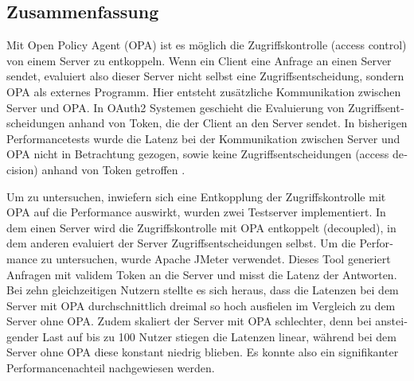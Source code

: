\begin{otherlanguage}{ngerman}
	\chapter*{Zusammenfassung}
	Mit Open Policy Agent (OPA) ist es möglich die Zugriffskontrolle (access control) von einem Server zu entkoppeln. Wenn ein Client eine Anfrage an einen Server sendet, evaluiert also dieser Server nicht selbst eine Zugriffsentscheidung, sondern OPA als externes Programm. Hier entsteht zusätzliche Kommunikation zwischen Server und OPA. In OAuth2 Systemen geschieht die Evaluierung von Zugriffsentscheidungen anhand von Token, die der Client an den Server sendet. In bisherigen Performancetests wurde die Latenz bei der Kommunikation zwischen Server und OPA nicht in Betrachtung gezogen, sowie keine Zugriffsentscheidungen (access decision) anhand von Token getroffen \citep{opaperformance:2021:07}.\smallskip

	Um zu untersuchen, inwiefern sich eine Entkopplung der Zugriffskontrolle mit OPA auf die Performance auswirkt, wurden zwei Testserver implementiert. In dem einen Server wird die Zugriffskontrolle mit OPA entkoppelt (decoupled), in dem anderen evaluiert der Server Zugriffsentscheidungen selbst. Um die Performance zu untersuchen, wurde Apache JMeter verwendet. Dieses Tool generiert Anfragen mit validem Token an die Server und misst die Latenz der Antworten. Bei zehn gleichzeitigen Nutzern stellte es sich heraus, dass die Latenzen bei dem Server mit OPA durchschnittlich dreimal so hoch ausfielen im Vergleich zu dem Server ohne OPA. Zudem skaliert der Server mit OPA schlechter, denn bei ansteigender Last auf bis zu 100 Nutzer stiegen die Latenzen linear, während bei dem Server ohne OPA diese konstant niedrig blieben. Es konnte also ein signifikanter Performancenachteil nachgewiesen werden. 
	

\end{otherlanguage}
